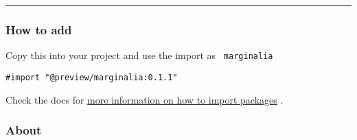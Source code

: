 \begin{Shaded}
\begin{Highlighting}[]
\NormalTok{)}
\end{Highlighting}
\end{Shaded}

\begin{center}\rule{0.5\linewidth}{0.5pt}\end{center}

\href{https://github.com/nleanba/typst-marginalia/blob/v0.1.1/Marginalia.pdf}{\pandocbounded{}}

\subsubsection{How to add}\label{how-to-add}

Copy this into your project and use the import as
\texttt{\ marginalia\ }

\begin{verbatim}
#import "@preview/marginalia:0.1.1"
\end{verbatim}



Check the docs for
\href{https://typst.app/docs/reference/scripting/\#packages}{more
information on how to import packages} .

\subsubsection{About}\label{about}

